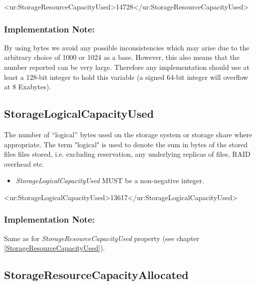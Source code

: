 \begin{XMLexample}
<ur:StorageResourceCapacityUsed>14728</ur:StorageResourceCapacityUsed>
\end{XMLexample}

\subsubsection*{Implementation Note:}
By using bytes we avoid any possible inconsistencies which may arise due to the arbitrary choice of 1000 or 1024 as a base. However, this also means that the number reported can be very large. Therefore any implementation should use at least a 128-bit integer to hold this variable (a signed 64-bit integer will overflow at 8 Exabytes).






\subsection{StorageLogicalCapacityUsed} \label{StorageLogicalCapacityUsed} 

The number of “logical” bytes used on the storage system or storage share where appropriate.
The term "logical" is used to denote the sum in bytes of the stored files files stored, i.e. excluding reservation, any underlying replicas of files, RAID overhead etc.

\begin{itemize}
\item \emph{StorageLogicalCapacityUsed} MUST be a non-negative integer.
\end{itemize}

\begin{XMLexample}
<ur:StorageLogicalCapacityUsed>13617</ur:StorageLogicalCapacityUsed>
\end{XMLexample}

\subsubsection*{Implementation Note:}
Same as for \emph{StorageResourceCapacityUsed} property (see chapter \ref{StorageResourceCapacityUsed}).






\subsection{StorageResourceCapacityAllocated} \label{StorageResourceCapacityAllocated} 

